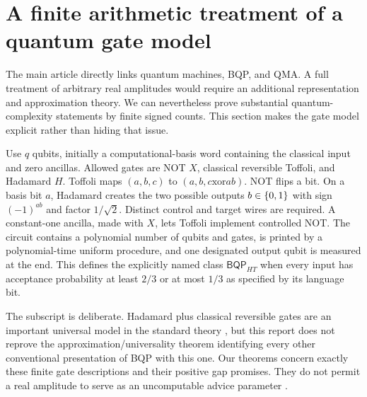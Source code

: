 \section{A finite arithmetic treatment of a quantum gate model}
\label{sec:quantum}

The main article directly links quantum machines, BQP, and QMA. A full treatment of arbitrary real amplitudes would require an additional representation and approximation theory. We can nevertheless prove substantial quantum-complexity statements by finite signed counts. This section makes the gate model explicit rather than hiding that issue.

Use $q$ qubits, initially a computational-basis word containing the classical input and zero ancillas. Allowed gates are NOT $X$, classical reversible Toffoli, and Hadamard $H$. Toffoli maps $(a,b,c)$ to $(a,b,c\mathbin{\mathrm{xor}}ab)$. NOT flips a bit. On a basis bit $a$, Hadamard creates the two possible outputs $b\in\{0,1\}$ with sign $(-1)^{ab}$ and factor $1/\sqrt2$. Distinct control and target wires are required. A constant-one ancilla, made with $X$, lets Toffoli implement controlled NOT. The circuit contains a polynomial number of qubits and gates, is printed by a polynomial-time uniform procedure, and one designated output qubit is measured at the end. This defines the explicitly named class $\mathsf{BQP}_{HT}$ when every input has acceptance probability at least $2/3$ or at most $1/3$ as specified by its language bit.

The subscript is deliberate. Hadamard plus classical reversible gates are an important universal model in the standard theory \cite{Shi2003}, but this report does not reprove the approximation/universality theorem identifying every other conventional presentation of BQP with this one. Our theorems concern exactly these finite gate descriptions and their positive gap promises. They do not permit a real amplitude to serve as an uncomputable advice parameter \cite{AdlemanDeMarraisHuang1997}.

